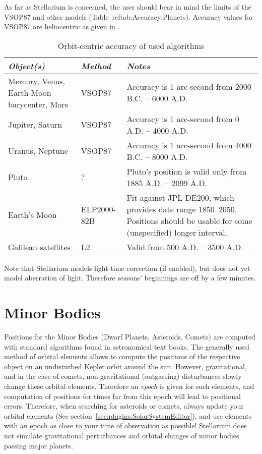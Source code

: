 As far as Stellarium is concerned, the user should bear in mind the
limits of the VSOP87 and other models (Table~ref{tab:Accuracy:Planets}).
Accuracy values for VSOP87 are heliocentric as given in \cite{1988A&A...202..309B}.

\begin{table}[tb]
\begin{tabularx}{\textwidth}{X|l|X}
\toprule
\emph{Object(s)} & \emph{Method} & \emph{Notes}\tabularnewline
\midrule
Mercury, Venus, Earth-Moon barycenter, Mars & VSOP87 & Accuracy is 1 arc-second from 2000 B.C. -- 6000 A.D. \\%
Jupiter, Saturn                             & VSOP87 & Accuracy is 1 arc-second from 0 A.D. -- 4000 A.D.    \\%
Uranus, Neptune                             & VSOP87 & Accuracy is 1 arc-second from 4000 B.C. -- 8000 A.D. \\%
Pluto                                       & ?      & Pluto's position is valid only from 1885 A.D. -- 2099 A.D.\\%
Earth's Moon                                & ELP2000-82B & Fit against JPL DE200, which provides date range 1850--2050. 
                                                            Positions should be usable for some (unspecified) longer interval. \\%
Galilean satellites                         & L2     & Valid from 500 A.D. -- 3500 A.D.\\ %
\bottomrule
\end{tabularx}
\caption{Orbit-centric accuracy of used algorithms}
\label{tab:Accuracy:Planets}
\end{table}

\noindent Note that Stellarium models light-time correction (if enabled), but does not yet model aberration of light. 
Therefore seasons' beginnings are off by a few minutes.

\section{Minor Bodies}
\label{sec:Accuracy:MinorBodies}

Positions for the Minor Bodies (Dwarf Planets, Asteroids, Comets) are
computed with standard algorithms found in astronomical text
books. The generally used method of orbital elements allows to compute
the positions of the respective object on an undisturbed Kepler orbit
around the sun. However, gravitational, and in the case of comets,
non-gravitational (outgassing) disturbances slowly change these
orbital elements. Therefore an \emph{epoch} is given for such
elements, and computation of positions for times far from this epoch
will lead to positional errors. Therefore, when searching for
asteroids or comets, always update your orbital elements (See section~\ref{sec:plugins:SolarSystemEditor}), 
and use elements with an epoch as close to your time of observation as
possible! Stellarium does not simulate gravitational perturbances and
orbital changes of minor bodies passing major planets.

